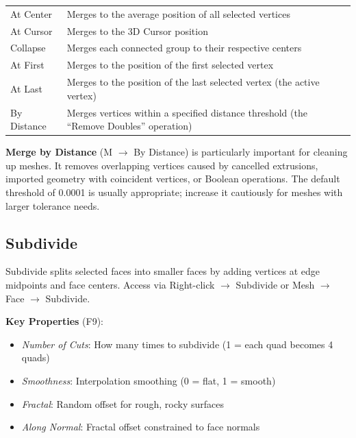 \begin{center}
\begin{tabularx}{\textwidth}{L{3.5cm}X}
\toprule
{}
 &  \\
\midrule
At Center & Merges to the average position of all selected vertices \\
At Cursor & Merges to the 3D Cursor position \\
Collapse & Merges each connected group to their respective centers \\
At First & Merges to the position of the first selected vertex \\
At Last & Merges to the position of the last selected vertex (the active vertex) \\
By Distance & Merges vertices within a specified distance threshold (the ``Remove Doubles'' operation) \\
\bottomrule
\end{tabularx}
\end{center}

\begin{warningbox}
\textbf{Merge by Distance} (M $\rightarrow$ By Distance) is particularly important for cleaning up meshes. It removes overlapping vertices caused by cancelled extrusions, imported geometry with coincident vertices, or Boolean operations. The default threshold of 0.0001 is usually appropriate; increase it cautiously for meshes with larger tolerance needs.
\end{warningbox}

\subsection{Subdivide}
\label{sec:subdivide}

Subdivide splits selected faces into smaller faces by adding vertices at edge midpoints and face centers. Access via Right-click $\rightarrow$ Subdivide or Mesh $\rightarrow$ Face $\rightarrow$ Subdivide.

\textbf{Key Properties} (F9):
\begin{itemize}[leftmargin=2em]
  \item \textit{Number of Cuts}: How many times to subdivide (1 = each quad becomes 4 quads)
  \item \textit{Smoothness}: Interpolation smoothing (0 = flat, 1 = smooth)
  \item \textit{Fractal}: Random offset for rough, rocky surfaces
  \item \textit{Along Normal}: Fractal offset constrained to face normals
\end{itemize}

